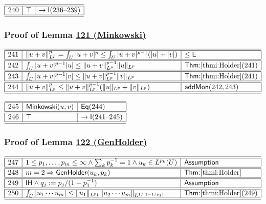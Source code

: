 \documentclass[11pt,reqno]{amsart}
\begin{document}
\medskip

\noindent$%
\begin{array}{|r|l|l|}
\hline\hline
240 & \top & \to\mathsf{I}(236\text{--}239) \\ \hline\hline
\end{array}%
$

\medskip

\subsubsection*{Proof of Lemma \hyperlink{thm:Minkowski}{121 (\textsf{Minkowski})}}

\noindent$%
\begin{array}{|r|l|l|}
\hline\hline
241 & \|u+v\|_{L^{p}}^{p}=\int_{U}|u+v|^{p}\le\int_{U}|u+v|^{p-1}(|u|+|v|) & \le\mathsf{E} \\ \hline\hline
242 & \int_{U}|u+v|^{p-1}|u|\le\|u+v\|_{L^{p}}^{p-1}\|u\|_{L^{p}} & \textsf{Thm:}\ref{thmi:Holder}(241) \\ \hline\hline
243 & \int_{U}|u+v|^{p-1}|v|\le\|u+v\|_{L^{p}}^{p-1}\|v\|_{L^{p}} & \textsf{Thm:}\ref{thmi:Holder}(241) \\ \hline\hline
244 & \|u+v\|_{L^{p}}^{p}\le\|u+v\|_{L^{p}}^{p-1}(\|u\|_{L^{p}}+\|v\|_{L^{p}}) & \mathsf{addMon}(242,243) \\ \hline\hline
\end{array}%
$

\medskip

\noindent$%
\begin{array}{|r|l|l|}
\hline\hline
245 & \mathsf{Minkowski}(u,v) & \mathsf{Eq}(244) \\ \hline\hline
246 & \top & \to\mathsf{I}(241\text{--}245) \\ \hline\hline
\end{array}%
$

\medskip

\subsubsection*{Proof of Lemma \hyperlink{thm:GenHolder}{122 (\textsf{GenHolder})}}

\noindent$%
\begin{array}{|r|l|l|}
\hline\hline
247 & 1\le p_{1},\dots,p_{m}\le\infty\wedge\sum_{k}p_{k}^{-1}=1\wedge u_{k}\in L^{p_{k}}(U) & \textsf{Assumption} \\ \hline\hline
248 & m=2\Rightarrow\mathsf{GenHolder}(u_{k},p_{k}) & \textsf{Thm:}\ref{thmi:Holder} \\ \hline\hline
249 & \mathsf{IH}\wedge q_{j}:=p_{j}/(1-p_{1}^{-1}) & \textsf{Assumption} \\ \hline\hline
250 & \int_{U}|u_{1}\cdots u_{m}|\le\|u_{1}\|_{L^{p_{1}}}\|u_{2}\cdots u_{m}\|_{L^{1/(1-1/p_{1})}} & \textsf{Thm:}\ref{thmi:Holder}(249) \\ \hline\hline
\end{array}%
$
\end{document}

